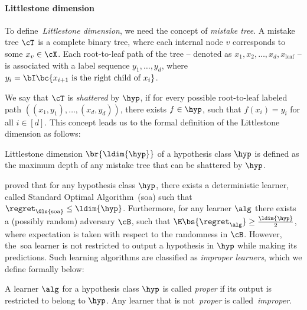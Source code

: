 \paragraph{Littlestone dimension}

To define~\emph{Littlestone dimension}, we need the concept  of \emph{mistake tree}.  A mistake tree \(\cT\) is a complete binary tree, where  each internal node \(v\) corresponds to some \(x_v \in \cX\). Each root-to-leaf path of the tree -- denoted as \(x_1, x_2, \ldots, x_d, x_\mathrm{leaf}\) -- is associated with a label sequence \(y_1, \ldots, y_d\), 
where \(y_i = \bI\bc{x_{i+1} \text{ is the right child of }x_i}\).
 
We say that \(\cT\) is \emph{shattered} by \(\hyp\), if 
for every possible root-to-leaf labeled path \(((x_1, y_1), \ldots, (x_d, y_d))\), there exists \(f \in \hyp\), such that \(f(x_i) = y_i\) for all \(i \in [d]\). This concept leads us to the formal definition of the Littlestone dimension as follows:
\begin{definition}\label{defn:littlestone}
    Littlestone dimension \(\br{\ldim{\hyp}}\) of a hypothesis class \(\hyp\) is defined as the maximum depth of any mistake tree that can be shattered by  \(\hyp\).
\end{definition}


    \citet{littlestone1988learning} proved that for any hypothesis class \(\hyp\), there exists a deterministic learner, called Standard Optimal Algorithm~(\Gls{soa})
    such that \(\regret_{\mathrm{\Gls{soa}}} \leq \ldim{\hyp}\). Furthermore, for any learner \(\alg\) there exists a (possibly random) adversary \(\cB\), such that \(\E \bs{\regret_{\alg}} \geq \frac{\ldim{\hyp}}{2}\), where expectation is taken with respect to the randomness in \(\cB\). However, the~\Gls{soa} learner is not restricted to output a hypothesis in \(\hyp\) while making its predictions. Such learning algorithms are classified as \emph{improper learners}, which we define formally below:


\begin{definition}\label{def:proper}
    A learner \(\alg\) for a hypothesis class \(\hyp\) is called \emph{proper} if its output  is restricted to belong to \(\hyp\). Any learner that is not~\emph{proper} is called~\emph{improper}.
\end{definition}

